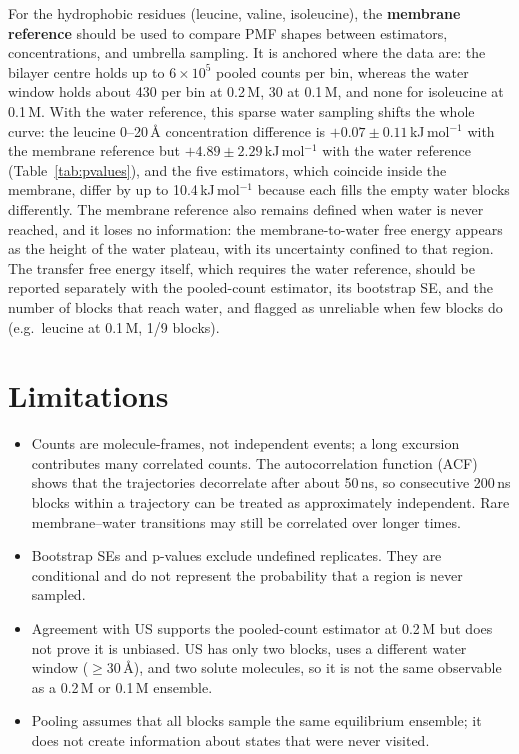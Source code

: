 \documentclass[11pt,a4paper]{article}
\newcommand{\kJ}{\,kJ\,mol$^{-1}$}
\begin{document}
For the hydrophobic residues (leucine, valine, isoleucine), the \textbf{membrane reference}
should be used to compare PMF shapes between estimators, concentrations, and umbrella sampling.
It is anchored where the data are: the bilayer centre holds up to $6\times10^5$ pooled counts
per bin, whereas the water window holds about 430 per bin at 0.2\,M, 30 at 0.1\,M, and none for
isoleucine at 0.1\,M. With the water reference, this sparse water sampling shifts the whole
curve: the leucine 0--20\,\AA{} concentration difference is $+0.07 \pm 0.11$\kJ{} with the
membrane reference but $+4.89 \pm 2.29$\kJ{} with the water reference (Table~\ref{tab:pvalues}),
and the five estimators, which coincide inside the membrane, differ by up to 10.4\kJ{} because
each fills the empty water blocks differently. The membrane reference also remains defined when
water is never reached, and it loses no information: the membrane-to-water free energy appears
as the height of the water plateau, with its uncertainty confined to that region. The transfer
free energy itself, which requires the water reference, should be reported separately with the
pooled-count estimator, its bootstrap SE, and the number of blocks that reach water, and flagged
as unreliable when few blocks do (e.g.\ leucine at 0.1\,M, 1/9 blocks).

\section{Limitations}
\begin{itemize}
  \item Counts are molecule-frames, not independent events; a long excursion contributes many
  correlated counts. The autocorrelation function (ACF) shows that the trajectories decorrelate
  after about 50\,ns, so consecutive 200\,ns blocks within a trajectory can be treated as
  approximately independent. Rare membrane--water transitions may still be correlated over
  longer times.
  \item Bootstrap SEs and p-values exclude undefined replicates. They are conditional and do
  not represent the probability that a region is never sampled.
  \item Agreement with US supports the pooled-count estimator at 0.2\,M but does not prove it is
  unbiased. US has only two blocks, uses a different water window ($\ge 30$\,\AA), and two solute
  molecules, so it is not the same observable as a 0.2\,M or 0.1\,M ensemble.
  \item Pooling assumes that all blocks sample the same equilibrium ensemble; it does not
  create information about states that were never visited.
\end{itemize}
\end{document}
